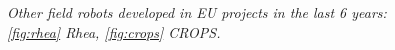 \begin{figure}
	\centering
	\qquad
	\caption{\textit{Other field robots developed in EU projects in the last 6 years: \ref{fig:rhea} Rhea, \ref{fig:crops} CROPS.}}
\end{figure}

